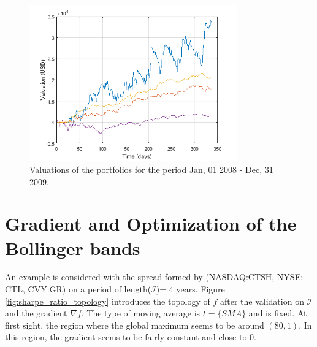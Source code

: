 \documentclass[11pt,a4,twosided,singlespacing,titlepagenumber=on]{scrreprt}
\numberwithin{equation}{chapter} %
\theoremstyle{remark}
\begin{document}
\begin{figure}[!htb]
\centering
\includegraphics[width = 0.8\textwidth]{perf_valuation_1.png}
\caption{Valuations of the portfolios for the period Jan, 01 2008 - Dec, 31 2009.}
\label{fig:1}
\end{figure}


\section{Gradient and Optimization of the Bollinger bands}

An example is considered with the spread formed by (NASDAQ:CTSH, NYSE: CTL, CVY:GR) on a period of length($\mathcal{I}$)= 4 years. Figure \ref{fig:sharpe_ratio_topology} introduces the topology of $f$ after the validation on $\mathcal{I}$ and the gradient $\nabla f$. The type of moving average is $t = \{ SMA \}$ and is fixed. At first sight, the region where the global maximum seems to be around $(80,1)$. In this region, the gradient seems to be fairly constant and close to 0.
\end{document}
